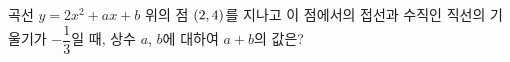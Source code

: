 곡선 $y=2x^2+ax+b$ 위의 점 $(2{,}\mkern3mu\mathopen{}4)$를 지나고 이 점에서의 접선과 수직인 직선의 기울기가 $-\dfrac{1}{3}$일 때, 상수 $a$, $b$에 대하여 $a+b$의 값은?
